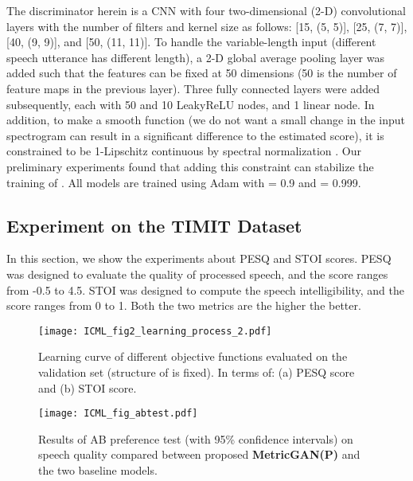 \documentclass{article}
\begin{document}
The discriminator herein is a CNN with four two-dimensional (2-D) convolutional layers with the number of filters and kernel size as follows: [15, (5, 5)], [25, (7, 7)], [40, (9, 9)], and [50, (11, 11)]. To handle the variable-length input (different speech utterance has different length), a 2-D global average pooling layer was added such that the features can be fixed at 50 dimensions (50 is the number of feature maps in the previous layer). Three fully connected layers were added subsequently, each with 50 and 10 LeakyReLU nodes, and 1 linear node. In addition, to make  a smooth function (we do not want a small change in the input spectrogram can result in a significant difference to the estimated score), it is constrained to be 1-Lipschitz continuous by spectral normalization \cite{miyato2018spectral}.  Our preliminary experiments found that adding this constraint can stabilize the training of . All models are trained using Adam \cite{kingma2014adam} with  = 0.9  and  = 0.999.




\subsection{Experiment on the TIMIT Dataset}
In this section, we show the experiments about PESQ and STOI scores.  PESQ was designed to evaluate the quality of processed speech, and the score ranges from -0.5 to 4.5. STOI was designed to compute the speech intelligibility, and the score ranges from 0 to 1. Both the two metrics are the higher the better. 

\begin{figure}[ht]
\vskip -0.1in
\begin{center}
\centerline{\texttt{[image: ICML\_fig2\_learning\_process\_2.pdf]}}
\vskip -0.2in
\caption{Learning curve of different objective functions evaluated on the validation set (structure of  is fixed). In terms of: (a) PESQ score and (b) STOI score.}
\label{fig:learning_process}
\end{center}
\vskip -0.2in
\end{figure}

\begin{figure}[ht]
\vskip 0.05in
\begin{center}
\centerline{\texttt{[image: ICML\_fig\_abtest.pdf]}}
\vskip 0.0in
\caption{Results of AB preference test (with 95\% confidence intervals) on speech quality compared between proposed \textbf{MetricGAN(P)} and the two baseline models.}
\label{fig:abtest}
\end{center}
\vskip -0.2in
\end{figure}
\end{document}
